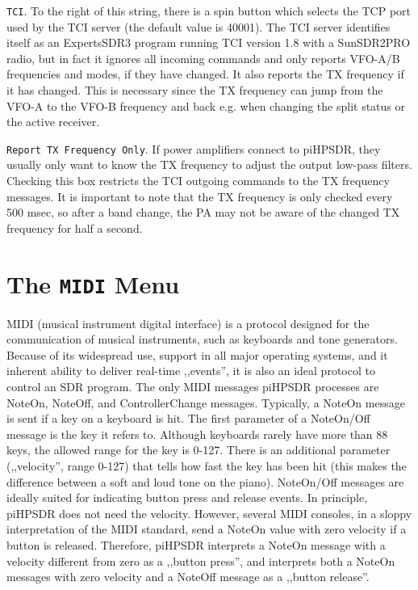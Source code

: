 \documentclass[12pt]{book}
\def\rett#1{\texttt{\color{red}#1}}
\def\pH{pi\-HPSDR\xspace}
\begin{document}
\rett{TCI}. To the right of this string, there is a spin button which selects the TCP port used by the
TCI  server (the default value is 40001). The TCI server identifies itself as an ExpertsSDR3 program
running TCI version 1.8 with a SunSDR2PRO radio, but in fact it ignores all incoming commands and only
reports VFO-A/B frequencies and modes, if they have changed. It also reports the TX frequency if it has changed.
This is necessary since the TX frequency can jump from the VFO-A to the VFO-B frequency and back e.g. when
changing the split status or the active receiver.

\rett{Report TX  Frequency Only}. If power amplifiers connect to \pH, they usually only want to know the
TX frequency to adjust the output low-pass filters. Checking this box restricts the TCI outgoing commands
to the TX  frequency messages. It is important  to note that the TX frequency is only  checked every
500 msec, so after a band change, the PA may  not be aware of  the changed TX frequency for half  a second.


\section{The \texttt{MIDI} Menu}
\label{sec:midimenu}
MIDI (musical instrument digital interface) is a protocol designed for the communication of
musical instruments, such as keyboards and tone generators. Because of its widespread use,
support in all major operating systems, and it inherent ability to deliver real-time ,,events'',
it is also an ideal protocol to control an SDR program. The only MIDI messages \pH processes
are NoteOn, NoteOff, and ControllerChange messages. Typically, a NoteOn message is sent if
a key on a keyboard is hit. The first parameter of a NoteOn/Off message is the key
it refers to. Although keyboards rarely have more than 88 keys, the allowed range for
the key is 0-127. There is an additional parameter (,,velocity'', range 0-127) that tells how
fast the key has been hit (this makes the difference between a soft and loud tone on the piano).
NoteOn/Off messages are ideally suited for indicating button press and release events. In principle,
\pH does not need the velocity. However, several MIDI consoles, in a sloppy interpretation of
the MIDI standard, send a NoteOn value with zero velocity if a button is released. Therefore,
\pH interprets a NoteOn message with a velocity different from zero as a ,,button press'',
and interprets both a NoteOn messages with zero velocity and a NoteOff message as a ,,button release''.
\end{document}
